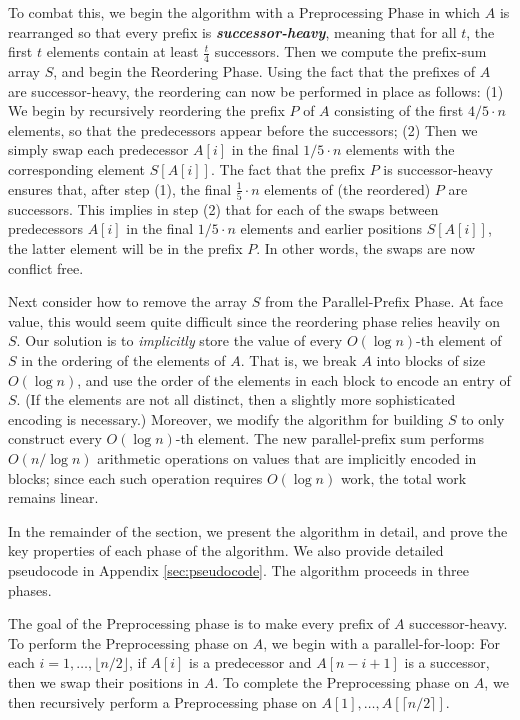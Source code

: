 \documentclass[twocolumn,10pt]{article}
\newcommand{\defn}[1]{{\textit{\textbf{\boldmath #1}}}\xspace}
\renewcommand{\paragraph}[1]{\vspace{0.09in}\noindent{\bf \boldmath #1.}}
\theoremstyle{remark}
\theoremstyle{remark}
\begin{document}
To combat this, we begin the algorithm with a Preprocessing Phase in
which $A$ is rearranged so that every prefix is
\defn{successor-heavy}, meaning that for all $t$, the first $t$
elements contain at least $\frac{t}{4}$ successors. Then we compute
the prefix-sum array $S$, and begin the Reordering Phase. Using the
fact that the prefixes of $A$ are successor-heavy, the reordering can
now be performed in place as follows: (1) We begin by recursively
reordering the prefix $P$ of $A$ consisting of the first $4/5 \cdot n$
elements, so that the predecessors appear before the successors; (2)
Then we simply swap each predecessor $A[i]$ in the final $1/5 \cdot n$
elements with the corresponding element $S[A[i]]$. The fact that the
prefix $P$ is successor-heavy ensures that, after step (1), the final 
$\frac{1}{5} \cdot n$ elements of (the reordered) $P$ are successors. 
This implies in step (2) that for each of the swaps between predecessors $A[i]$
in the final $1/5 \cdot n$ elements and earlier positions $S[A[i]]$, the latter
element will be in the prefix $P$. In other words, the swaps are now conflict
free.

Next consider how to remove the array $S$ from the Parallel-Prefix
Phase. At face value, this would seem quite difficult since the
reordering phase relies heavily on $S$. Our solution is to
\emph{implicitly} store the value of every $O(\log n)$-th element of
$S$ in the ordering of the elements of $A$. That is, we break $A$ into
blocks of size $O(\log n)$, and use the order of the elements in each
block to encode an entry of $S$. (If the elements are not all
  distinct, then a slightly more sophisticated encoding is necessary.)
Moreover, we modify the algorithm for building $S$ to only construct
every $O(\log n)$-th element. The new parallel-prefix sum performs
$O(n / \log n)$ arithmetic operations on values that are implicitly
encoded in blocks; since each such operation requires $O(\log n)$
work, the total work remains linear.

In the remainder of the section, we present the algorithm in detail,
and prove the key properties of each phase of the algorithm. We also
provide detailed pseudocode in Appendix \ref{sec:pseudocode}. The
algorithm proceeds in three phases.

\paragraph{A Preprocessing Phase}
The goal of the Preprocessing phase is to make every prefix of $A$
successor-heavy. To perform the Preprocessing phase on $A$, we begin
with a parallel-for-loop: For each $i = 1, \ldots, \lfloor n /
2\rfloor$, if $A[i]$ is a predecessor and $A[n - i + 1]$ is a
successor, then we swap their positions in $A$. To complete the
Preprocessing phase on $A$, we then recursively perform a
Preprocessing phase on $A[1], \ldots, A[\lceil n / 2 \rceil]$.
\end{document}
